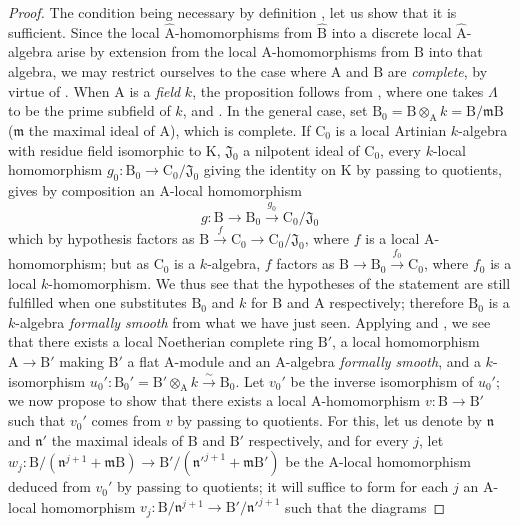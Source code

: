 \begin{proof}
The condition being necessary by definition , let us show that it is sufficient.
Since the local $\widehat{\mathrm{A}}$-homomorphisms from $\widehat{\mathrm{B}}$ into a discrete local $\widehat{\mathrm{A}}$-algebra arise by extension from the local $\mathrm{A}$-homomorphisms from $\mathrm{B}$ into that algebra, we may restrict ourselves to the case where $\mathrm{A}$ and $\mathrm{B}$ are \emph{complete}, by virtue of .
When $\mathrm{A}$ is a \emph{field} $k$, the proposition follows from , where one takes $\Lambda$ to be the prime subfield of $k$, and .
In the general case, set $\mathrm{B}_0=\mathrm{B}\otimes_\mathrm{A}k=\mathrm{B}/\mathfrak{m}\mathrm{B}$ ($\mathfrak{m}$ the maximal ideal of $\mathrm{A}$), which is complete.
If $\mathrm{C}_0$ is a local Artinian $k$-algebra with residue field isomorphic to $\mathrm{K}$, $\mathfrak{J}_0$ a nilpotent ideal of $\mathrm{C}_0$, every $k$-local homomorphism $g_0:\mathrm{B}_0\to\mathrm{C}_0/\mathfrak{J}_0$ giving the identity on $\mathrm{K}$ by passing to quotients, gives by composition an $\mathrm{A}$-local homomorphism
\[
  g:\mathrm{B}\to\mathrm{B}_0\xrightarrow{g_0}\mathrm{C}_0/\mathfrak{J}_0
\]
which by hypothesis factors as $\mathrm{B}\xrightarrow{f}\mathrm{C}_0\to\mathrm{C}_0/\mathfrak{J}_0$, where $f$ is a local $\mathrm{A}$-homomorphism; but as $\mathrm{C}_0$ is a $k$-algebra, $f$ factors as $\mathrm{B}\to\mathrm{B}_0\xrightarrow{f_0}\mathrm{C}_0$, where $f_0$ is a local $k$-homomorphism.
We thus see that the hypotheses of the statement are still fulfilled when one substitutes $\mathrm{B}_0$ and $k$ for $\mathrm{B}$ and $\mathrm{A}$ respectively; therefore $\mathrm{B}_0$ is a $k$-algebra \emph{formally smooth} from what we have just seen.
Applying  and , we see that there exists a local Noetherian complete ring $\mathrm{B}'$, a local homomorphism $\mathrm{A}\to\mathrm{B}'$ making $\mathrm{B}'$ a flat $\mathrm{A}$-module and an $\mathrm{A}$-algebra \emph{formally smooth}, and a $k$-isomorphism $u_0':\mathrm{B}_0'=\mathrm{B}'\otimes_\mathrm{A}k\xrightarrow{\sim}\mathrm{B}_0$.
Let $v_0'$ be the inverse isomorphism of $u_0'$; we now propose to show that there exists a local $\mathrm{A}$-homomorphism $v:\mathrm{B}\to\mathrm{B}'$ such that $v_0'$ comes from $v$ by passing to quotients.
For this, let us denote by $\mathfrak{n}$ and $\mathfrak{n}'$ the maximal ideals of $\mathrm{B}$ and $\mathrm{B}'$ respectively, and for every $j$, let $w_j:\mathrm{B}/(\mathfrak{n}^{j+1}+\mathfrak{m}\mathrm{B})\to\mathrm{B}'/(\mathfrak{n}'^{j+1}+\mathfrak{m}\mathrm{B}')$ be the $\mathrm{A}$-local homomorphism deduced from $v_0'$ by passing to quotients; it will suffice to form for each $j$ an $\mathrm{A}$-local homomorphism $v_j:\mathrm{B}/\mathfrak{n}^{j+1}\to\mathrm{B}'/\mathfrak{n}'^{j+1}$ such that the diagrams

\end{proof}
